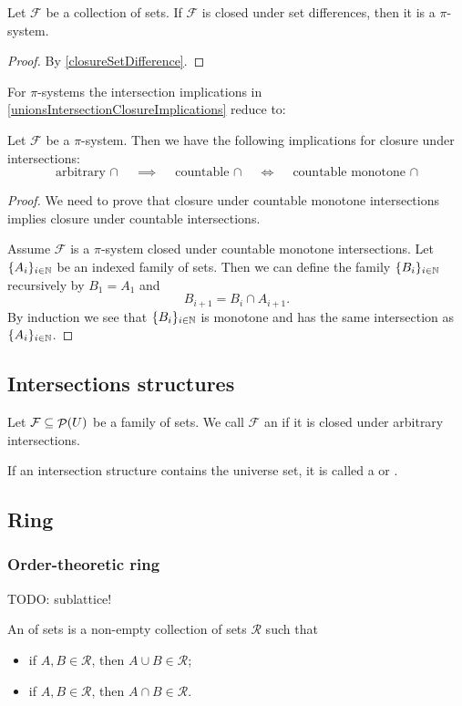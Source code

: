 \begin{lemma}
Let $\mathcal{F}$ be a collection of sets. If $\mathcal{F}$ is closed under set differences, then it is a $\pi$-system.
\end{lemma}
\begin{proof}
By \ref{closureSetDifference}.
\end{proof}

For $\pi$-systems the intersection implications in \ref{unionsIntersectionClosureImplications} reduce to:
\begin{lemma} \label{piSystemunionsIntersectionClosureImplications}
Let $\mathcal{F}$ be a $\pi$-system. Then we have the following implications for closure under intersections:
\[ \text{arbitrary $\cap$} \quad\implies\quad \text{countable $\cap$} \quad\iff\quad \text{countable monotone $\cap$} \]
\end{lemma}
\begin{proof}
We need to prove that closure under countable monotone intersections implies closure under countable intersections.

Assume $\mathcal{F}$ is a $\pi$-system closed under countable monotone intersections. Let $\{A_i\}_{i\in \mathbb{N}}$ be an indexed family of sets. Then we can define the family $\{B_i\}_{i\in \mathbb{N}}$ recursively by $B_1 = A_1$ and
\[ B_{i+1} = B_i \cap A_{i+1}. \]
By induction we see that $\{B_i\}_{i\in \mathbb{N}}$ is monotone and has the same intersection as $\{A_i\}_{i\in \mathbb{N}}$.
\end{proof}

\subsection{Intersections structures}
\begin{definition}
Let $\mathcal{F} \subseteq \mathop{\mathcal{P}}(U)$ be a family of sets. We call $\mathcal{F}$ an  if it is closed under arbitrary intersections.

If an intersection structure contains the universe set, it is called a  or .
\end{definition}

\subsection{Ring}
\subsubsection{Order-theoretic ring}
TODO: sublattice!
\begin{definition}
An  of sets is a non-empty collection of sets $\mathcal{R}$ such that
\begin{itemize}
\item if $A,B\in \mathcal{R}$, then $A\cup B\in \mathcal{R}$;
\item if $A,B\in \mathcal{R}$, then $A\cap B\in \mathcal{R}$.
\end{itemize}
\end{definition}

